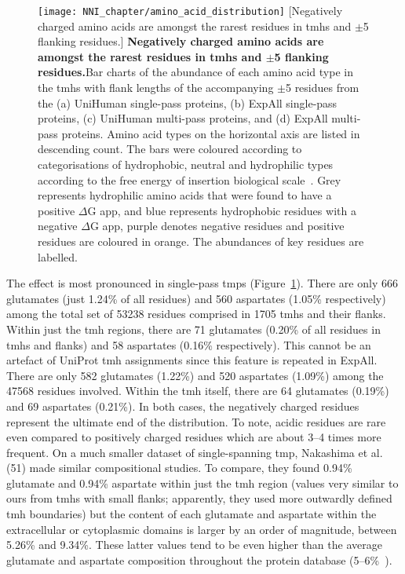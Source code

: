 \begin{figure}[!ht]
\centering
\texttt{[image: NNI\_chapter/amino\_acid\_distribution]}
[Negatively charged amino acids are amongst the rarest residues in \gls{tmh}s and $\pm$5 flanking residues.] {\textbf{Negatively charged amino acids are amongst the rarest residues in \gls{tmh}s and $\pm$5 flanking residues.}Bar charts of the abundance of each amino acid type in the \gls{tmh}s with flank lengths of the accompanying $\pm$5 residues from the (a) UniHuman single-pass proteins, (b) ExpAll single-pass proteins, (c) UniHuman multi-pass proteins, and (d) ExpAll multi-pass proteins.
Amino acid types on the horizontal axis are listed in descending count.
The bars were coloured according to categorisations of hydrophobic, neutral and hydrophilic types according to the free energy of insertion biological scale~\cite{Hessa2005}.
Grey represents hydrophilic amino acids that were found to have a positive $\Delta$G app, and blue represents hydrophobic residues with a negative $\Delta$G app, purple denotes negative residues and positive residues are coloured in orange.
The abundances of key residues are labelled.}

\label{fig:amino_acid_distribution}
\end{figure}

The effect is most pronounced in single-pass \gls{tmp}s (Figure~\ref{fig:amino_acid_distribution}).
There are only 666 glutamates (just 1.24\% of all residues) and 560 aspartates (1.05\% respectively) among the total set of 53238 residues comprised in 1705 \gls{tmh}s and their flanks.
Within just the \gls{tmh} regions, there are 71 glutamates (0.20\% of all residues in \gls{tmh}s and flanks) and 58 aspartates (0.16\% respectively).
This cannot be an artefact of UniProt \gls{tmh} assignments since this feature is repeated in ExpAll.
There are only 582 glutamates (1.22\%) and 520 aspartates (1.09\%) among the 47568 residues involved.
Within the \gls{tmh} itself, there are 64 glutamates (0.19\%) and 69 aspartates (0.21\%).
In both cases, the negatively charged residues represent the ultimate end of the distribution.
To note, acidic residues are rare even compared to positively charged residues which are about 3--4 times more frequent.
On a much smaller dataset of single-spanning \gls{tmp}, Nakashima et al.
(51) made similar compositional studies.
To compare, they found 0.94\% glutamate and 0.94\% aspartate within just the \gls{tmh} region (values very similar to ours from \gls{tmh}s with small flanks; apparently, they used more outwardly defined \gls{tmh} boundaries) but the content of each glutamate and aspartate within the extracellular or cytoplasmic domains is larger by an order of magnitude, between 5.26\% and 9.34\%.
These latter values tend to be even higher than the average glutamate and aspartate composition throughout the protein database (5--6\%~\cite{Nakashima1992}).

